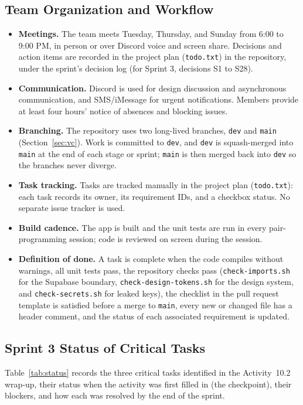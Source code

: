 \documentclass[12pt,letterpaper]{article}
\begin{document}
\subsection{Team Organization and Workflow}
\begin{itemize}
  \item \textbf{Meetings.} The team meets Tuesday, Thursday, and Sunday from 6:00 to
        9:00 PM, in person or over Discord voice and screen share. Decisions and
        action items are recorded in the project plan (\texttt{todo.txt}) in the
        repository, under the sprint's decision log (for Sprint 3, decisions S1 to
        S28).
  \item \textbf{Communication.} Discord is used for design discussion and asynchronous
        communication, and SMS/iMessage for urgent notifications. Members provide at
        least four hours' notice of absences and blocking issues.
  \item \textbf{Branching.} The repository uses two long-lived branches, \texttt{dev}
        and \texttt{main} (Section~\ref{sec:vc}). Work is committed to \texttt{dev},
        and \texttt{dev} is squash-merged into \texttt{main} at the end of each stage
        or sprint; \texttt{main} is then merged back into \texttt{dev} so the branches
        never diverge.
  \item \textbf{Task tracking.} Tasks are tracked manually in the project plan
        (\texttt{todo.txt}): each task records its owner, its requirement IDs, and a
        checkbox status. No separate issue tracker is used.
  \item \textbf{Build cadence.} The app is built and the unit tests are run in every
        pair-programming session; code is reviewed on screen during the session.
  \item \textbf{Definition of done.} A task is complete when the code compiles without
        warnings, all unit tests pass, the repository checks pass
        (\texttt{check-imports.sh} for the Supabase boundary,
        \texttt{check-design-tokens.sh} for the design system, and
        \texttt{check-secrets.sh} for leaked keys), the checklist in the pull request
        template is satisfied before a merge to \texttt{main}, every new or changed file has a header comment, and the status of
        each associated requirement is updated.
\end{itemize}

\subsection{Sprint 3 Status of Critical Tasks}
Table~\ref{tab:status} records the three critical tasks identified in the
Activity~10.2 wrap-up, their status when the activity was first filled in (the
checkpoint), their blockers, and how each was resolved by the end of the sprint.
\end{document}
